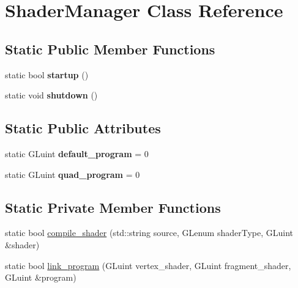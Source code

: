 \hypertarget{class_shader_manager}{}\section{Shader\+Manager Class Reference}
\label{class_shader_manager}
\subsection*{Static Public Member Functions}
\begin{DoxyCompactItemize}
\item 
\hypertarget{class_shader_manager_a2dfc28de3218c2b21caa75e4636e3719}{}static bool {\bfseries startup} ()\label{class_shader_manager_a2dfc28de3218c2b21caa75e4636e3719}

\item 
\hypertarget{class_shader_manager_a22378e1fffa4a76f549694718e483686}{}static void {\bfseries shutdown} ()\label{class_shader_manager_a22378e1fffa4a76f549694718e483686}

\end{DoxyCompactItemize}
\subsection*{Static Public Attributes}
\begin{DoxyCompactItemize}
\item 
\hypertarget{class_shader_manager_af40d450c0b4535804424d5e2135fe3a5}{}static G\+Luint {\bfseries default\+\_\+program} = 0\label{class_shader_manager_af40d450c0b4535804424d5e2135fe3a5}

\item 
\hypertarget{class_shader_manager_a4d38413d63db495ef09501cca91e9098}{}static G\+Luint {\bfseries quad\+\_\+program} = 0\label{class_shader_manager_a4d38413d63db495ef09501cca91e9098}

\end{DoxyCompactItemize}
\subsection*{Static Private Member Functions}
\begin{DoxyCompactItemize}
\item 
static bool \hyperlink{class_shader_manager_a37024011814ed3209f96875809470aa8}{compile\+\_\+shader} (std\+::string source, G\+Lenum shader\+Type, G\+Luint \&shader)
\item 
static bool \hyperlink{class_shader_manager_a3ca2b23acfbe2ff53ecbee598f0594f0}{link\+\_\+program} (G\+Luint vertex\+\_\+shader, G\+Luint fragment\+\_\+shader, G\+Luint \&program)
\end{DoxyCompactItemize}


